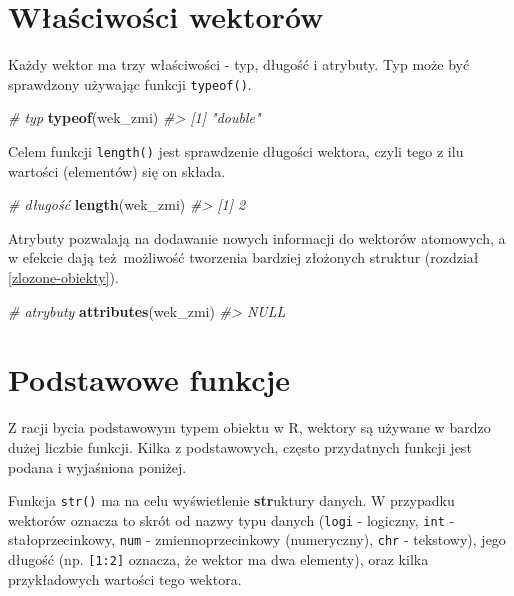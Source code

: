 \documentclass[paper=6in:9in,pagesize=pdftex,headinclude=on,footinclude=on,10pt]{scrbook}
\newenvironment{Shaded}{\begin{snugshade}}{\end{snugshade}}
\newcommand{\CommentTok}[1]{\textcolor[rgb]{0.56,0.35,0.01}{\textit{#1}}}
\newcommand{\KeywordTok}[1]{\textcolor[rgb]{0.13,0.29,0.53}{\textbf{#1}}}
\newcommand{\NormalTok}[1]{#1}
\begin{document}
\hypertarget{wasciwosci-wektorow}{%
\section{Właściwości wektorów}\label{wasciwosci-wektorow}}

Każdy wektor ma trzy właściwości - typ, długość i atrybuty.
Typ może być sprawdzony używając funkcji \texttt{typeof()}.

\begin{Shaded}
\begin{Highlighting}[]
\CommentTok{# typ}
\KeywordTok{typeof}\NormalTok{(wek_zmi)}
\CommentTok{#> [1] "double"}
\end{Highlighting}
\end{Shaded}

Celem funkcji \texttt{length()} jest sprawdzenie długości wektora, czyli tego z ilu wartości (elementów) się on składa.

\begin{Shaded}
\begin{Highlighting}[]
\CommentTok{# długość}
\KeywordTok{length}\NormalTok{(wek_zmi)}
\CommentTok{#> [1] 2}
\end{Highlighting}
\end{Shaded}

Atrybuty pozwalają na dodawanie nowych informacji do wektorów atomowych, a w efekcie dają też~możliwość tworzenia bardziej złożonych struktur (rozdział \ref{zlozone-obiekty}).

\begin{Shaded}
\begin{Highlighting}[]
\CommentTok{# atrybuty}
\KeywordTok{attributes}\NormalTok{(wek_zmi)}
\CommentTok{#> NULL}
\end{Highlighting}
\end{Shaded}

\hypertarget{pf-vector}{%
\section{Podstawowe funkcje}\label{pf-vector}}

Z racji bycia podstawowym typem obiektu w R, wektory są używane w bardzo dużej liczbie funkcji.
Kilka z podstawowych, często przydatnych funkcji jest podana i wyjaśniona poniżej.

Funkcja \texttt{str()} ma na celu wyświetlenie \textbf{str}uktury danych.
W przypadku wektorów oznacza to skrót od nazwy typu danych (\texttt{logi} - logiczny, \texttt{int} - stałoprzecinkowy, \texttt{num} - zmiennoprzecinkowy (numeryczny), \texttt{chr} - tekstowy), jego długość (np. \texttt{{[}1:2{]}} oznacza, że wektor ma dwa elementy), oraz kilka przykładowych wartości tego wektora.
\end{document}
